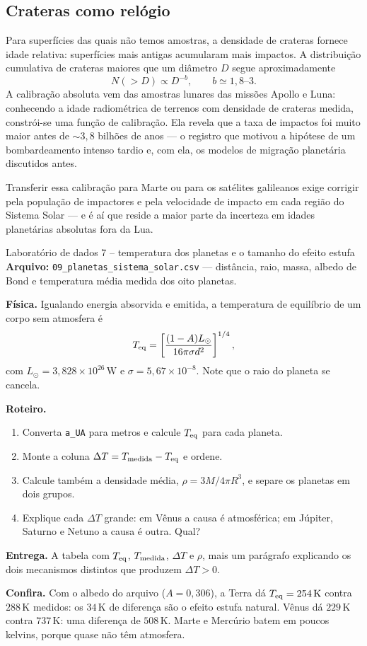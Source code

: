 \documentclass[11pt,a4paper]{article}
\begin{document}
\subsection*{Crateras como relógio}

Para superfícies das quais não temos amostras, a densidade de crateras fornece idade relativa: superfícies mais antigas acumularam mais impactos. A distribuição cumulativa de crateras maiores que um diâmetro $D$ segue aproximadamente
\[
N(>D)\propto D^{-b},
\qquad
b\simeq1{,}8\text{--}3.
\]
A calibração absoluta vem das amostras lunares das missões Apollo e Luna: conhecendo a idade radiométrica de terrenos com densidade de crateras medida, constrói-se uma função de calibração. Ela revela que a taxa de impactos foi muito maior antes de $\sim3{,}8$ bilhões de anos --- o registro que motivou a hipótese de um bombardeamento intenso tardio e, com ela, os modelos de migração planetária discutidos antes.

Transferir essa calibração para Marte ou para os satélites galileanos exige corrigir pela população de impactores e pela velocidade de impacto em cada região do Sistema Solar --- e é aí que reside a maior parte da incerteza em idades planetárias absolutas fora da Lua.

\begin{lessonblock}[borderline west={2pt}{0pt}{astroGold}]{Laboratório de dados 7 -- temperatura dos planetas e o tamanho do efeito estufa}
\textbf{Arquivo:} \texttt{09\_planetas\_sistema\_solar.csv} --- distância, raio, massa, albedo de Bond e temperatura média medida dos oito planetas.

\textbf{Física.} Igualando energia absorvida e emitida, a temperatura de equilíbrio de um corpo sem atmosfera é
\[
T_{\rm eq}=\left[\frac{(1-A)L_\odot}{16\pi\sigma d^{2}}\right]^{1/4},
\]
com $L_\odot=3{,}828\times10^{26}\,\mathrm{W}$ e $\sigma=5{,}67\times10^{-8}$. Note que o raio do planeta se cancela.

\textbf{Roteiro.}
\begin{enumerate}
\item Converta \texttt{a\_UA} para metros e calcule $T_{\rm eq}$ para cada planeta.
\item Monte a coluna $\Delta T=T_{\rm medida}-T_{\rm eq}$ e ordene.
\item Calcule também a densidade média, $\rho=3M/4\pi R^{3}$, e separe os planetas em dois grupos.
\item Explique cada $\Delta T$ grande: em Vênus a causa é atmosférica; em Júpiter, Saturno e Netuno a causa é outra. Qual?
\end{enumerate}

\textbf{Entrega.} A tabela com $T_{\rm eq}$, $T_{\rm medida}$, $\Delta T$ e $\rho$, mais um parágrafo explicando os dois mecanismos distintos que produzem $\Delta T>0$.

\textbf{Confira.} Com o albedo do arquivo ($A=0{,}306$), a Terra dá $T_{\rm eq}=254\,\mathrm{K}$ contra $288\,\mathrm{K}$ medidos: os $34\,\mathrm{K}$ de diferença são o efeito estufa natural. Vênus dá $229\,\mathrm{K}$ contra $737\,\mathrm{K}$: uma diferença de $508\,\mathrm{K}$. Marte e Mercúrio batem em poucos kelvins, porque quase não têm atmosfera.
\end{lessonblock}
\end{document}
